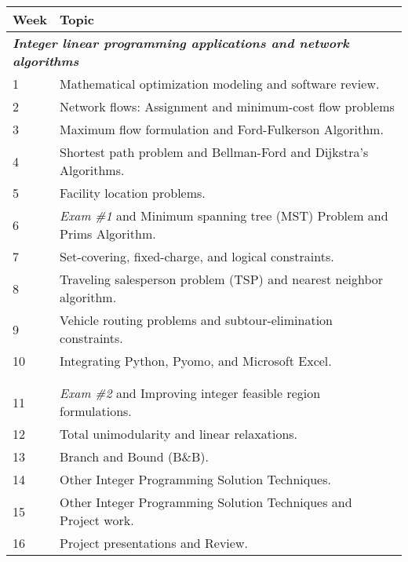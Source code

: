 \documentclass[12pt]{article}
\theoremstyle{definition}
\begin{document}
\renewcommand\arraystretch{1.5}
\begin{longtable}{ll}
Week \hspace{.2in} & Topic \\
\hline 
\multicolumn{2}{l}{\textbf{\textit{Integer linear programming applications and network algorithms}}}\\
1 & Mathematical optimization modeling and software review.  \\
2 & Network flows: Assignment and minimum-cost flow problems\\
3 & Maximum flow formulation and Ford-Fulkerson Algorithm.\\ 
4 & Shortest path problem and Bellman-Ford and Dijkstra's Algorithms.\\
5 & Facility location problems. \\
6 & \textit{Exam \#1} and Minimum spanning tree (MST) Problem and Prims Algorithm. \\
7 & Set-covering, fixed-charge, and logical constraints.\\
8 & Traveling salesperson problem (TSP) and nearest neighbor algorithm. \\
9 & Vehicle routing problems and subtour-elimination constraints. \\
10 & Integrating Python, Pyomo, and Microsoft Excel. \\
& \\
\pagebreak
\multicolumn{2}{l}{\textbf{\textit{Integer programming: theory and algorithms}}} \\
11 & \textit{Exam \#2} and Improving integer feasible region formulations. \\
12 & Total unimodularity and linear relaxations. \\
13 & Branch and Bound (B\&B). \\
14 & Other Integer Programming Solution Techniques. \\
15 & Other Integer Programming Solution Techniques and Project work. \\
16 & Project presentations and Review. \\
\end{longtable}
\end{document}
